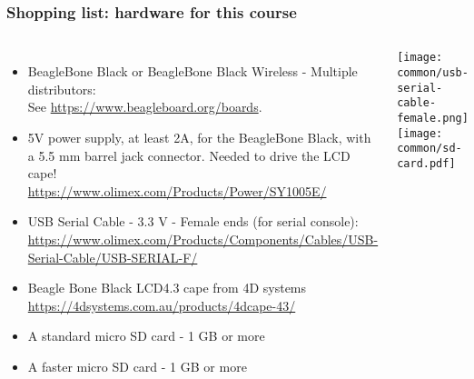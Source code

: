 \begin{frame}
\frametitle{Shopping list: hardware for this course}
  \begin{columns}
    \begin{itemize}
      \item BeagleBone Black or BeagleBone Black Wireless - Multiple distributors: \\
	    See \url{https://www.beagleboard.org/boards}.
      \item 5V power supply, at least 2A, for the BeagleBone Black, with a 5.5 mm barrel
            jack connector. Needed to drive the LCD cape!\\
	    \url{https://www.olimex.com/Products/Power/SY1005E/}
      \item USB Serial Cable - 3.3 V - Female ends (for serial console): \\
	    \url{https://www.olimex.com/Products/Components/Cables/USB-Serial-Cable/USB-SERIAL-F/}
      \item Beagle Bone Black LCD4.3 cape from 4D systems\\
            \url{https://4dsystems.com.au/products/4dcape-43/}
      \item A standard micro SD card - 1 GB or more
      \item A faster micro SD card - 1 GB or more
    \end{itemize}
    \texttt{[image: common/usb-serial-cable-female.png]} \\
    \texttt{[image: common/sd-card.pdf]} \\
  \end{columns}
\end{frame}
